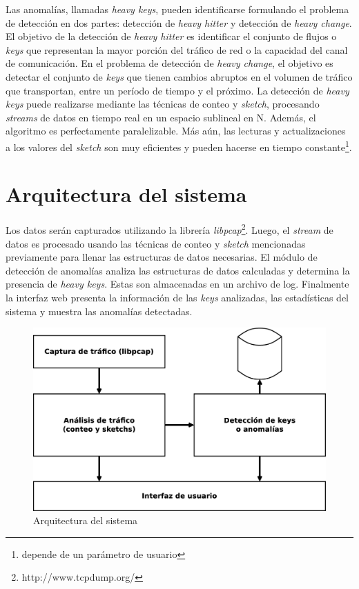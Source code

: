\documentclass[a4paper,10pt, oneside]{article}
\begin{document}
Las anomalías, llamadas \textit{heavy keys}, pueden identificarse formulando el problema de detección en dos partes: detección de \textit{heavy hitter} y detección de \textit{heavy change}. El objetivo de la detección de \textit{heavy hitter} es identificar el conjunto de flujos o \textit{keys} que representan la mayor porción del tráfico de red o la capacidad del canal de comunicación\cite{estan2002new}. En el problema de detección de \textit{heavy change}, el objetivo es detectar el conjunto de \textit{keys} que tienen cambios abruptos en el volumen de tráfico que transportan, entre un período de tiempo y el próximo\cite{krishnamurthy2003sketch}. La detección de \textit{heavy keys} puede realizarse mediante las técnicas de conteo y \textit{sketch}, procesando \textit{streams} de datos en tiempo real en un espacio sublineal en N. Además, el algoritmo es perfectamente paralelizable\cite{liberty2013simple}. Más aún, las lecturas y actualizaciones a los valores del \textit{sketch} son muy eficientes y pueden hacerse en tiempo constante\footnote{depende de un parámetro de usuario}\cite{goyal2010sketching}.



\section{Arquitectura del sistema}
Los datos serán capturados utilizando la librería \textit{libpcap}\footnote{http://www.tcpdump.org/}. Luego, el \textit{stream} de datos es procesado usando las técnicas de conteo y \textit{sketch} mencionadas previamente para llenar las estructuras de datos necesarias. El módulo de detección de anomalías analiza las estructuras de datos calculadas y determina la presencia de \textit{heavy keys}. Estas son almacenadas en un archivo de log. Finalmente la interfaz web presenta la información de las \textit{keys} analizadas, las estadísticas del sistema y muestra las anomalías detectadas.

\begin{figure}[htpb]
	\centering
	\includegraphics[scale=0.2]{graph/arquitectura}
	\caption{Arquitectura del sistema}
\end{figure}
\end{document}
